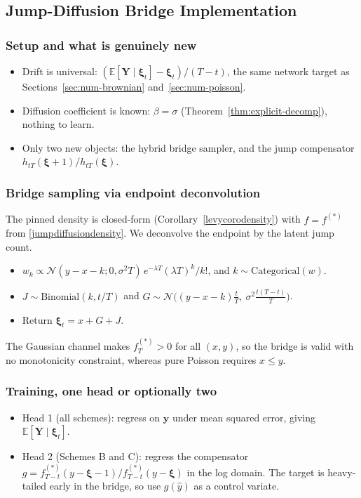 \documentclass{article}
\def\E{\mathbb{E}}
\def\xib{\boldsymbol{\xi}}
\theoremstyle{definition}
\begin{document}
\subsection{Jump-Diffusion Bridge Implementation}\label{sec:num-jumpdiff}
\subsubsection*{Setup and what is genuinely new}
\begin{itemize}
  \item Drift is universal: $(\E[\boldsymbol{Y}\mid\xib_t]-\xib_t)/(T-t)$, the same network target as Sections~\ref{sec:num-brownian} and~\ref{sec:num-poisson}.
  \item Diffusion coefficient is known: $\beta=\sigma$ (Theorem~\ref{thm:explicit-decomp}), nothing to learn.
  \item Only two new objects: the hybrid bridge sampler, and the jump compensator $h_{tT}(\xib+1)/h_{tT}(\xib)$.
\end{itemize}

\subsubsection*{Bridge sampling via endpoint deconvolution}
The pinned density is closed-form (Corollary~\ref{levycorodensity}) with $f=f^{(*)}$ from
\eqref{jumpdiffusiondensity}. We deconvolve the endpoint by the latent jump count.
\begin{itemize}
  \item $w_k \propto \mathcal N(y-x-k;0,\sigma^2 T)\,e^{-\lambda T}(\lambda T)^k/k!$, and $k\sim\mathrm{Categorical}(w)$.
  \item $J\sim\mathrm{Binomial}(k,t/T)$ and $G\sim\mathcal N\!\big((y-x-k)\tfrac tT,\ \sigma^2\tfrac{t(T-t)}{T}\big)$.
  \item Return $\xib_t = x + G + J$.
\end{itemize}
The Gaussian channel makes $f^{(*)}_T>0$ for all $(x,y)$, so the bridge is valid with no monotonicity
constraint, whereas pure Poisson requires $x\le y$.

\subsubsection*{Training, one head or optionally two}
\begin{itemize}
  \item Head 1 (all schemes): regress on $\boldsymbol{y}$ under mean squared error, giving $\E[\boldsymbol{Y}\mid\xib_t]$.
  \item Head 2 (Schemes B and C): regress the compensator $g=f^{(*)}_{T-t}(y-\xib-1)/f^{(*)}_{T-t}(y-\xib)$ in the log domain. The target is heavy-tailed early in the bridge, so use $g(\hat y)$ as a control variate.
\end{itemize}
\end{document}
